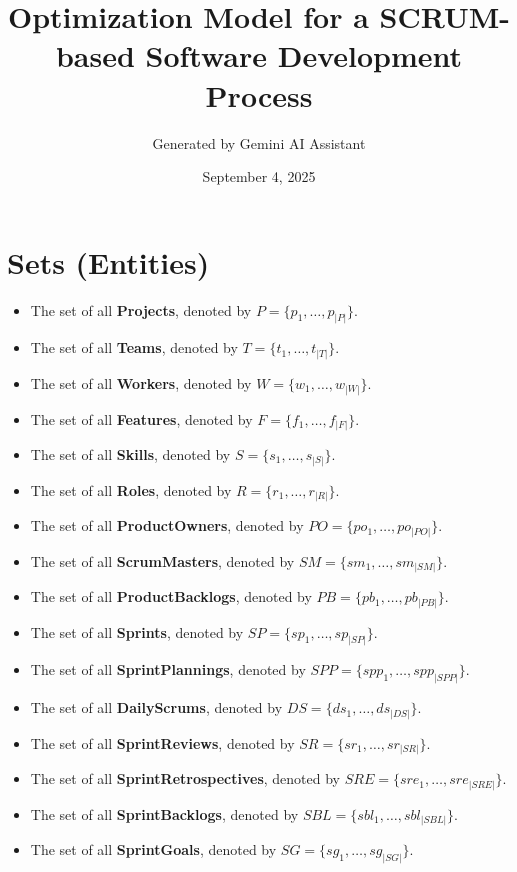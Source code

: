 \documentclass[11pt]{article}
\title{Optimization Model for a SCRUM-based Software Development Process}
\author{Generated by Gemini AI Assistant}
\date{September 4, 2025}
\begin{document}
\maketitle
\tableofcontents
\newpage

\section{Sets (Entities)}
\begin{itemize}
    \item The set of all \textbf{Projects}, denoted by $P = \{p_1, \dots, p_{|P|}\}$.
    \item The set of all \textbf{Teams}, denoted by $T = \{t_1, \dots, t_{|T|}\}$.
    \item The set of all \textbf{Workers}, denoted by $W = \{w_1, \dots, w_{|W|}\}$.
    \item The set of all \textbf{Features}, denoted by $F = \{f_1, \dots, f_{|F|}\}$.
    \item The set of all \textbf{Skills}, denoted by $S = \{s_1, \dots, s_{|S|}\}$.
    \item The set of all \textbf{Roles}, denoted by $R = \{r_1, \dots, r_{|R|}\}$.
    \item The set of all \textbf{ProductOwners}, denoted by $PO = \{po_1, \dots, po_{|PO|}\}$.
    \item The set of all \textbf{ScrumMasters}, denoted by $SM = \{sm_1, \dots, sm_{|SM|}\}$.
    \item The set of all \textbf{ProductBacklogs}, denoted by $PB = \{pb_1, \dots, pb_{|PB|}\}$.
    \item The set of all \textbf{Sprints}, denoted by $SP = \{sp_1, \dots, sp_{|SP|}\}$.
    \item The set of all \textbf{SprintPlannings}, denoted by $SPP = \{spp_1, \dots, spp_{|SPP|}\}$.
    \item The set of all \textbf{DailyScrums}, denoted by $DS = \{ds_1, \dots, ds_{|DS|}\}$.
    \item The set of all \textbf{SprintReviews}, denoted by $SR = \{sr_1, \dots, sr_{|SR|}\}$.
    \item The set of all \textbf{SprintRetrospectives}, denoted by $SRE = \{sre_1, \dots, sre_{|SRE|}\}$.
    \item The set of all \textbf{SprintBacklogs}, denoted by $SBL = \{sbl_1, \dots, sbl_{|SBL|}\}$.
    \item The set of all \textbf{SprintGoals}, denoted by $SG = \{sg_1, \dots, sg_{|SG|}\}$.

\end{itemize}
\end{document}
